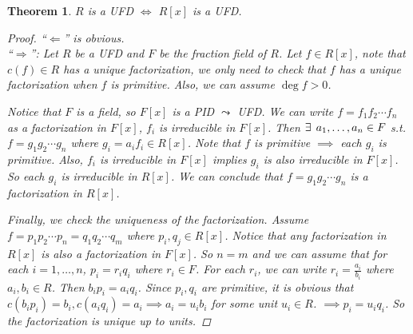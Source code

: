 \documentclass[a4paper]{article}
\let\existstemp\exists
\renewcommand*{\exists}{\existstemp\mkern4mu}
\theoremstyle{mystyle}
\newtheorem{theorem}{Theorem}
\begin{document}
\begin{theorem}
  $R$ is a UFD $\iff$ $R[x]$ is a UFD.
  \begin{proof}
    ``$\Leftarrow$'' is obvious. \\
    ``$\Rightarrow$'': Let $R$ be a UFD and $F$ be the fraction field of $R$.
    Let $f \in R[x]$, note that $c(f) \in R$ has a unique factorization,
    we only need to check that $f$ has a unique factorization when $f$ is primitive.
    Also, we can assume $\deg f > 0$.

    Notice that $F$ is a field, so $F[x]$ is a PID $\leadsto$ UFD.
    We can write $f = f_1f_2\dotsm f_n$ as a factorization in $F[x]$,
    $f_i$ is irreducible in $F[x]$.
    Then $\exists a_1, \dots, a_n \in F$ s.t.
    $f = g_1 g_2 \dotsm g_n$ where $g_i = a_if_i \in R[x]$.
    Note that $f$ is primitive $\implies$ each $g_i$ is primitive.
    Also, $f_i$ is irreducible in $F[x]$ implies $g_i$ is also irreducible in $F[x]$.
    So each $g_i$ is irreducible in $R[x]$.  We can conclude that 
    $f = g_1 g_2 \dotsm g_n$ is a factorization in $R[x]$.

    Finally, we check the uniqueness of the factorization. Assume
    $f = p_1p_2 \dotsm p_n = q_1q_2 \dotsm q_m$ where $p_i, q_j \in R[x]$.
    Notice that any factorization in $R[x]$ is also a factorization in $F[x]$.
    So $n = m$ and we can assume that for each $i = 1,\dots, n$,
    $p_i = r_i q_i$ where $r_i \in F$. For each $r_i$, we can write
    $r_i = \frac{a_i}{b_i}$ where $a_i, b_i \in R$. Then $b_i p_i = a_i q_i$.
    Since $p_i, q_i$ are primitive, it is obvious that
    $c(b_i p_i) = b_i, c(a_i q_i) = a_i \implies a_i = u_ib_i$ for some unit $u_i \in R$.
    $\implies p_i = u_i q_i$. So the factorization is unique up to units.
  \end{proof}
\end{theorem}
\end{document}
